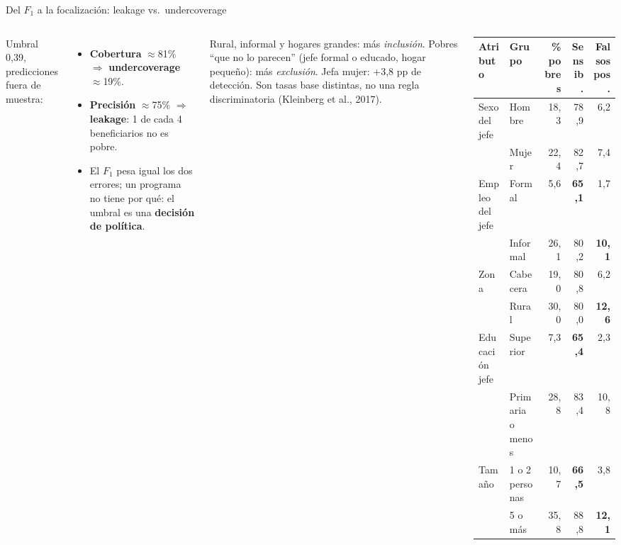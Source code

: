 \documentclass[aspectratio=169,10pt]{beamer}
\begin{document}
\begin{frame}{Del $F_1$ a la focalización: leakage vs.\ undercoverage}
\begin{columns}[T]
\small
Umbral 0,39, predicciones fuera de muestra:
\begin{itemize}
  \item \textbf{Cobertura} $\approx$81\% $\Rightarrow$
    \textbf{undercoverage} $\approx$19\%.
  \item \textbf{Precisión} $\approx$75\% $\Rightarrow$ \textbf{leakage}: 1 de
    cada 4 beneficiarios no es pobre.
  \item El $F_1$ pesa igual los dos errores; un programa no tiene por qué:
    el umbral es una \textbf{decisión de política}.
\end{itemize}
\footnotesize
Rural, informal y hogares grandes: más \emph{inclusión}. Pobres ``que no lo
parecen'' (jefe formal o educado, hogar pequeño): más \emph{exclusión}. Jefa
mujer: +3,8 pp de detección. Son tasas base distintas, no una regla
discriminatoria (Kleinberg et al., 2017).

\scriptsize
\setlength{\tabcolsep}{4pt}
\begin{tabular}{@{}llrrr@{}}
\toprule
Atributo & Grupo & \% pobres & Sensib. & Falsos pos. \\
\midrule
Sexo del jefe & Hombre & 18,3 & 78,9 & 6,2 \\
              & Mujer  & 22,4 & 82,7 & 7,4 \\
\midrule
Empleo del jefe & Formal   &  5,6 & \textbf{65,1} &  1,7 \\
                & Informal & 26,1 & 80,2 & \textbf{10,1} \\
\midrule
Zona & Cabecera & 19,0 & 80,8 &  6,2 \\
     & Rural    & 30,0 & 80,0 & \textbf{12,6} \\
\midrule
Educación jefe & Superior & 7,3 & \textbf{65,4} & 2,3 \\
               & Primaria o menos & 28,8 & 83,4 & 10,8 \\
\midrule
Tamaño & 1 o 2 personas & 10,7 & \textbf{66,5} & 3,8 \\
       & 5 o más        & 35,8 & 88,8 & \textbf{12,1} \\
\bottomrule
\end{tabular}
\end{columns}
\end{frame}
\end{document}
